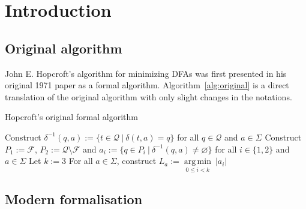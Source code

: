 \documentclass[12pt, a4 paper]{article}
\theoremstyle{definition}
\begin{document}
\section{Introduction}
\subsection{Original algorithm}
John E. Hopcroft's algorithm for minimizing DFAs was first presented in his original 1971 paper \cite{Hop71} as a formal algorithm. Algorithm~\ref{alg:original} is a direct translation of the original algorithm with only slight changes in the notations.

\begin{algorithm}[H]
\SetAlgoLined
\caption{Hopcroft's original formal algorithm}
\label{alg:original}
Construct $\delta^{-1}(q, a) := \{t \in \mathcal{Q}\ |\ \delta(t, a) = q\}$ for all $q \in \mathcal{Q}$ and $a \in \Sigma$ \;\label{alg:original:1}
Construct $P_1 := \mathcal{F}$, $P_2 := \mathcal{Q} \setminus \mathcal{F}$ and $a_i := \{q \in P_i \ | \ \delta^{-1}(q, a) \neq \varnothing \}$ for all $i \in \{1, 2\}$ and $a \in \Sigma$ \;
Let $k := 3$ \;
For all $a \in \Sigma$, construct $L_a := \underset{0 \leq i < k}{\operatorname*{arg\,min}}\ \left| a_i \right|$ \; \label{alg:original:4}
\end{algorithm}

\subsection{Modern formalisation}
\end{document}
